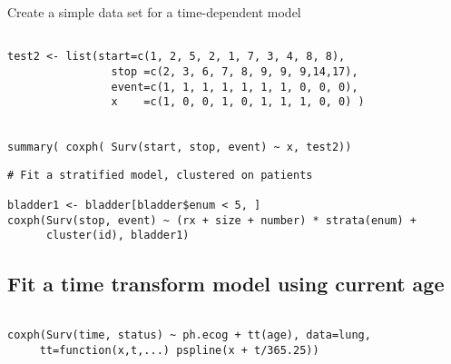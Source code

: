  Create a simple data set for a time-dependent model

\begin{framed}
\begin{verbatim}

test2 <- list(start=c(1, 2, 5, 2, 1, 7, 3, 4, 8, 8),
                stop =c(2, 3, 6, 7, 8, 9, 9, 9,14,17),
                event=c(1, 1, 1, 1, 1, 1, 1, 0, 0, 0),
                x    =c(1, 0, 0, 1, 0, 1, 1, 1, 0, 0) )


summary( coxph( Surv(start, stop, event) ~ x, test2))
\end{verbatim}
\end{framed}
\begin{framed}
	\begin{verbatim}
# Fit a stratified model, clustered on patients 

bladder1 <- bladder[bladder$enum < 5, ] 
coxph(Surv(stop, event) ~ (rx + size + number) * strata(enum) + 
      cluster(id), bladder1)
\end{verbatim}
\end{framed}
\subsection*{ Fit a time transform model using current age}
\begin{framed}
	\begin{verbatim}
	
coxph(Surv(time, status) ~ ph.ecog + tt(age), data=lung,
     tt=function(x,t,...) pspline(x + t/365.25))

\end{verbatim}
\end{framed}
